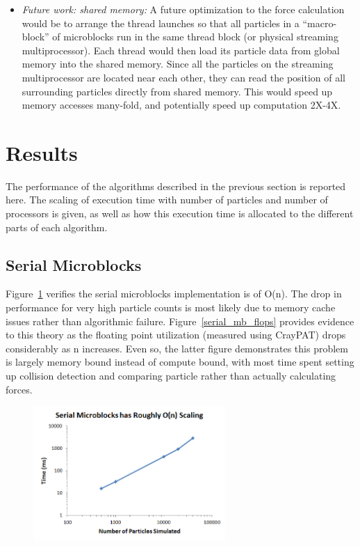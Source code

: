 \documentclass[11pt]{article} %
\begin{document}
\begin{itemize}
\item {\em Future work: shared memory: } A future optimization to the force calculation would be to arrange the thread launches so that all particles in a ``macro-block'' of microblocks run in the same thread block (or physical streaming multiprocessor). Each thread would then load its particle data from global memory into the shared memory. Since all the particles on the streaming multiprocessor are located near each other, they can read the position of all surrounding particles directly from shared memory. This would speed up memory accesses many-fold, and potentially speed up computation 2X-4X.
\end{itemize}





\section{Results}
\label{results-section}

The performance of the algorithms described in the previous section is reported here. The scaling of execution time with number of particles and number of processors is given, as well as how this execution time is allocated to the different parts of each algorithm.

\subsection{Serial Microblocks}

Figure~\ref{serial_mb_n} verifies the serial microblocks implementation is of O(n). The drop in performance for very high particle counts is most likely due to memory cache issues rather than algorithmic failure. Figure~\ref{serial_mb_flops} provides evidence to this theory as the floating point utilization (measured using CrayPAT) drops considerably as n increases. Even so, the latter figure demonstrates this problem is largely memory bound instead of compute bound, with most time spent setting up collision detection and comparing particle rather than actually calculating forces.

\begin{figure}[!h]
\centering
\includegraphics[width=0.65\textwidth]{figures/serial_mb_n.png}
\caption{}
\label{serial_mb_n}
\end{figure}
\end{document}
